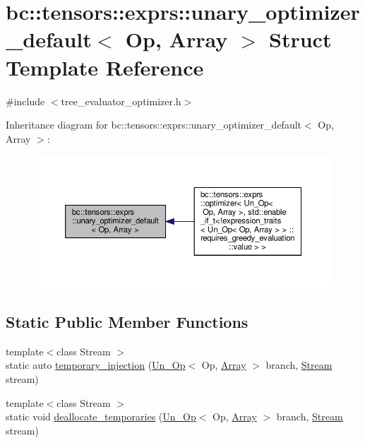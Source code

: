 \hypertarget{structbc_1_1tensors_1_1exprs_1_1unary__optimizer__default}{}\section{bc\+:\+:tensors\+:\+:exprs\+:\+:unary\+\_\+optimizer\+\_\+default$<$ Op, Array $>$ Struct Template Reference}
\label{structbc_1_1tensors_1_1exprs_1_1unary__optimizer__default}


{\ttfamily \#include $<$tree\+\_\+evaluator\+\_\+optimizer.\+h$>$}



Inheritance diagram for bc\+:\+:tensors\+:\+:exprs\+:\+:unary\+\_\+optimizer\+\_\+default$<$ Op, Array $>$\+:\nopagebreak
\begin{figure}[H]
\begin{center}
\leavevmode
\includegraphics[width=350pt]{structbc_1_1tensors_1_1exprs_1_1unary__optimizer__default__inherit__graph}
\end{center}
\end{figure}
\subsection*{Static Public Member Functions}
\begin{DoxyCompactItemize}
\item 
{\footnotesize template$<$class Stream $>$ }\\static auto \hyperlink{structbc_1_1tensors_1_1exprs_1_1unary__optimizer__default_aa325a1aff5d4bed87fa8ce2a78aba581}{temporary\+\_\+injection} (\hyperlink{structbc_1_1tensors_1_1exprs_1_1Un__Op}{Un\+\_\+\+Op}$<$ Op, \hyperlink{structbc_1_1tensors_1_1exprs_1_1Array}{Array} $>$ branch, \hyperlink{classbc_1_1streams_1_1Stream}{Stream} stream)
\item 
{\footnotesize template$<$class Stream $>$ }\\static void \hyperlink{structbc_1_1tensors_1_1exprs_1_1unary__optimizer__default_a0ed074b12b16309b711d060d05730c23}{deallocate\+\_\+temporaries} (\hyperlink{structbc_1_1tensors_1_1exprs_1_1Un__Op}{Un\+\_\+\+Op}$<$ Op, \hyperlink{structbc_1_1tensors_1_1exprs_1_1Array}{Array} $>$ branch, \hyperlink{classbc_1_1streams_1_1Stream}{Stream} stream)
\end{DoxyCompactItemize}


